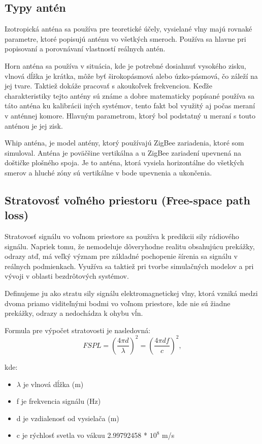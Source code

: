 \documentclass[11pt,twoside,a4paper]{book}
\begin{document}
\subsection{Typy antén}
\indent Izotropická anténa sa používa pre teoretické účely, vysielané vlny majú rovnaké parametre, ktoré popisujú anténu vo všetkých smeroch. Používa sa hlavne pri popisovaní a porovnávaní vlastností reálnych antén. 


\noindent Horn anténa sa používa v situácia, kde je potrebné dosiahnuť vysokého zisku, vlnová dĺžka je krátka, môže byť širokopásmová alebo úzko-pásmová, čo záleží na jej tvare. Taktiež dokáže pracovať s akoukoľvek frekvenciou. Keďže charakteristiky tejto antény sú známe a dobre matematicky popísané používa sa táto anténa ku kalibrácii iných systémov, tento fakt bol využitý aj počas meraní v anténnej komore. Hlavným parametrom, ktorý bol podstatný u meraní s touto anténou je jej zisk.


\noindent Whip anténa, je model antény, ktorý používajú ZigBee zariadenia, ktoré som simuloval. Anténa je poväčšine vertikálna a u ZigBee zariadení upevnená na doštičke plošného spoja. Je to anténa, ktorá vysiela horizontálne do všetkých smerov a hluché zóny sú vertikálne v bode upevnenia a ukončenia.

\subsection{Stratovosť voľného priestoru (Free-space path loss)}

Stratovosť signálu vo voľnom priestore sa používa k predikcii sily rádiového signálu. Napriek tomu, že nemodeluje dôveryhodne realitu obsahujúcu prekážky, odrazy atď, má veľký význam pre základné pochopenie šírenia sa signálu v reálnych podmienkach. Využíva sa taktiež pri tvorbe simulačných modelov a pri vývoji v oblasti bezdrôtových systémov.

Definujeme ju ako stratu sily signálu elektromagnetickej vlny, ktorá vzniká medzi dvoma priamo viditeľnými bodmi vo voľnom priestore, kde nie sú žiadne prekážky, odrazy a nedochádza k ohybu vĺn.

Formula pre výpočet stratovosti je nasledovná:
$$FSPL =  \left(\dfrac{4 \pi d}{\lambda}\right)^{2}  = \left(\dfrac{4 \pi d f}{c}\right)^{2},$$


kde:
\begin{itemize}
 \item $\lambda$ je vlnová dĺžka (m)
 \item f je frekvencia signálu (Hz)
 \item d je vzdialenosť od vysielača (m)
 \item c je rýchlosť svetla vo vákuu 2.99792458 * $10^{8}$ m/s
\end{itemize}
\end{document}
